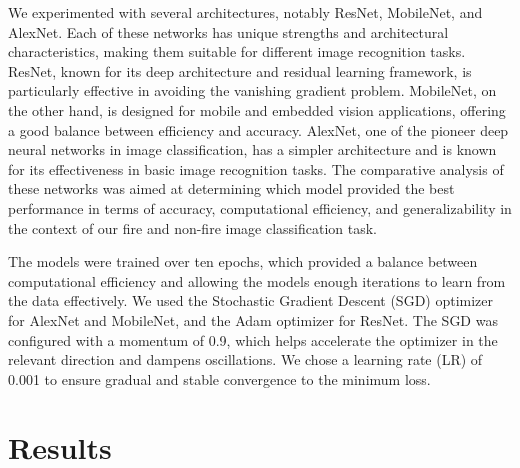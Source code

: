 We experimented with several architectures, notably ResNet, MobileNet, and AlexNet. Each of these networks has unique strengths and architectural characteristics, making them suitable for different image recognition tasks. ResNet, known for its deep architecture and residual learning framework, is particularly effective in avoiding the vanishing gradient problem. MobileNet, on the other hand, is designed for mobile and embedded vision applications, offering a good balance between efficiency and accuracy. AlexNet, one of the pioneer deep neural networks in image classification, has a simpler architecture and is known for its effectiveness in basic image recognition tasks. The comparative analysis of these networks was aimed at determining which model provided the best performance in terms of accuracy, computational efficiency, and generalizability in the context of our fire and non-fire image classification task.

The models were trained over ten epochs, which provided a balance between computational efficiency and allowing the models enough iterations to learn from the data effectively. We used the Stochastic Gradient Descent (SGD) optimizer for AlexNet and MobileNet, and the Adam optimizer for ResNet. The SGD was configured with a momentum of 0.9, which helps accelerate the optimizer in the relevant direction and dampens oscillations. We chose a learning rate (LR) of 0.001 to ensure gradual and stable convergence to the minimum loss.

\section{Results}

\begin{center}
\end{center}


